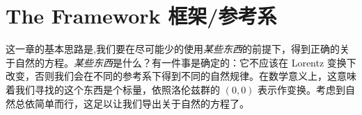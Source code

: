 


\chapter{The Framework 框架/参考系}
这一章的基本思路是,我们要在尽可能少的使用\emph{某些东西}的前提下，得到正确的关于自然的方程。\emph{某些东西}是什么？有一件事是确定的：它不应该在 Lorentz 变换下改变，否则我们会在不同的参考系下得到不同的自然规律。在数学意义上，这意味着我们寻找的这个东西是个标量，依照洛伦兹群的 \( (0,0) \) 表示作变换。考虑到自然总依简单而行，这足以让我们导出关于自然的方程了。

